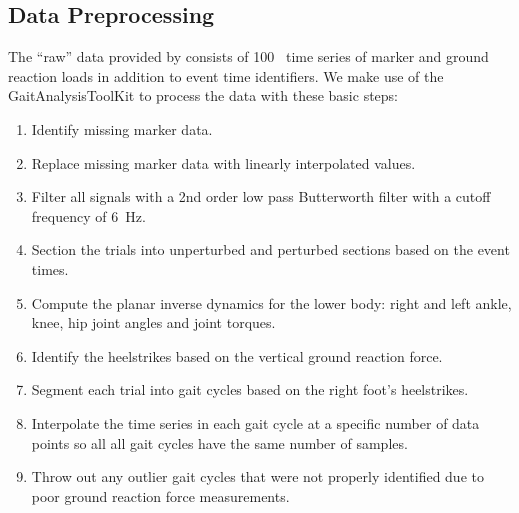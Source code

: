 \documentclass{article}
\begin{document}
\subsection{Data Preprocessing}
%
The ``raw'' data provided by \cite{Moore2015} consists of 100~\si{\hertx} time
series of marker and ground reaction loads in addition to event time
identifiers. We make use of the GaitAnalysisToolKit to process the data with
these basic steps:
%
\begin{enumerate}
  \item Identify missing marker data.
  \item Replace missing marker data with linearly interpolated values.
  \item Filter all signals with a 2nd order low pass Butterworth filter with a
    cutoff frequency of 6~\si{\hertz}.
  \item Section the trials into unperturbed and perturbed sections based on the
    event times.
  \item Compute the planar inverse dynamics for the lower body: right and left
    ankle, knee, hip joint angles and joint torques.
  \item Identify the heelstrikes based on the vertical ground reaction force.
  \item Segment each trial into gait cycles based on the right foot's
    heelstrikes.
  \item Interpolate the time series in each gait cycle at a specific number of
    data points so all all gait cycles have the same number of samples.
  \item Throw out any outlier gait cycles that were not properly identified due
    to poor ground reaction force measurements.
\end{enumerate}


\end{document}
